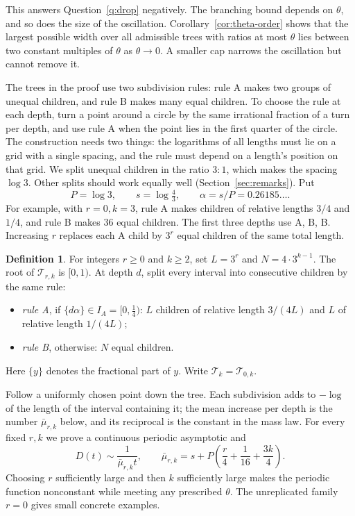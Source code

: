 \documentclass[11pt]{article}
\theoremstyle{definition}
\newtheorem{definition}[theorem]{Definition}
\theoremstyle{remark}
\newcommand{\cyl}{\mathcal T}
\newcommand{\fr}[1]{\{#1\}}
\begin{document}
This answers Question~\ref{q:drop} negatively. The branching bound
depends on $\theta$, and so does the size of the oscillation.
Corollary~\ref{cor:theta-order} shows that the largest possible width
over all admissible trees with ratios at most $\theta$ lies between two
constant multiples of $\theta$ as $\theta\to0$. A smaller cap narrows
the oscillation but cannot remove it.

The trees in the proof use two subdivision rules: rule A makes two
groups of unequal children, and rule B makes many equal children. To
choose the rule at each depth, turn a point around a circle by the same
irrational fraction of a turn per depth, and use rule A when the point
lies in the first quarter of the circle. The construction needs two
things: the logarithms of all lengths must lie on a grid with a single
spacing, and the rule must depend on a length's position on that grid.
We split unequal children in the ratio $3:1$, which makes the spacing
$\log3$. Other splits should work equally well
(Section~\ref{sec:remarks}). Put
\[
 P=\log3,\qquad s=\log\tfrac43,\qquad
 \alpha=s/P=0.26185\ldots.
\]
For example, with $r=0,k=3$, rule A makes children of relative lengths
$3/4$ and $1/4$, and rule B makes $36$ equal children.
The first three depths use A, B, B. Increasing $r$ replaces each A
child by $3^r$ equal children of the same total length.
\begin{definition}\label{def:tree}
For integers $r\ge0$ and $k\ge2$, set $L=3^r$ and $N=4\cdot3^{k-1}$.
The root of $\cyl_{r,k}$ is $[0,1)$. At depth $d$, split every interval
into consecutive children by the same rule:
\begin{itemize}
\item \emph{rule A}, if $\fr{d\alpha}\in I_A=[0,\frac14)$:
 $L$ children of relative length $3/(4L)$ and $L$ of relative length
 $1/(4L)$;
\item \emph{rule B}, otherwise: $N$ equal children.
\end{itemize}
Here $\fr y$ denotes the fractional part of $y$. Write $\cyl_k=\cyl_{0,k}$.
\end{definition}

Follow a uniformly chosen point down the tree. Each subdivision adds to
$-\log$ of the length of the interval containing it; the mean increase
per depth is the number $\bar\mu_{r,k}$ below, and its reciprocal is
the constant in the mass law. For every fixed $r,k$ we prove a
continuous periodic asymptotic and
\[
 D(t)\sim\frac1{\bar\mu_{r,k}t},\qquad
 \bar\mu_{r,k}=s+P\left(\frac r4+\frac1{16}+\frac{3k}4\right).
\]
Choosing $r$ sufficiently large and then $k$ sufficiently large makes
the periodic function nonconstant while meeting any prescribed $\theta$.
The unreplicated family $r=0$ gives small concrete examples.
\end{document}
